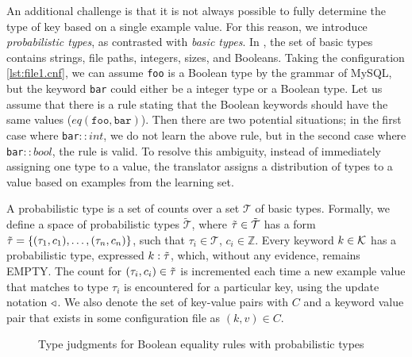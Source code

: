An additional challenge is that it is not always possible to fully determine the type of key based on a single example value. 
For this reason, we introduce \textit{probabilistic types}, as contrasted with \textit{basic types}.
In \app, the set of basic types contains strings, file paths, integers, sizes, and Booleans. 
Taking the configuration \ref{lst:file1.cnf}, we can assume {\tt foo} is a Boolean type by the grammar of MySQL,
  but the keyword {\tt bar} could either be a integer type or a Boolean type.
Let us assume that there is a rule stating that the Boolean keywords should have the same values ($eq(\texttt{foo},\texttt{bar})$).
Then there are two potential situations; in the first case where {\tt bar}$::int$, we do not learn the above rule, but in the second case where {\tt bar}$::bool$, the rule is valid.
To resolve this ambiguity, instead of immediately assigning one type to a value, the translator assigns a distribution of types to a value based on examples from the learning set.


A probabilistic type is a set of counts over a set $\mathcal{T}$ of basic types.
Formally, we define a space of probabilistic types $\tilde{\mathcal{T}}$, where $\tilde{\tau} \in \tilde{\mathcal{T}}$ has a form $\tilde{\tau}=\{(\tau_1, c_1),\ldots,(\tau_n, c_n)\}$, such that $\tau_i \in \mathcal{T}$, $c_i \in \mathbb{Z}$. 
Every keyword $k\in\mathcal{K}$ has a probabilistic type, expressed $k:\tilde{\tau}$, which, without any evidence, remains {\scriptsize EMPTY}.
The count for $(\tau_i,c_i) \in \tilde{\tau}$ is incremented each time a new example value that matches to type $\tau_i$ is encountered for a particular key, using the update notation $\triangleleft$.
We also denote the set of key-value pairs with $C$ and a keyword value pair that exists in some configuration file as $(k,v) \in C$.

{
\setlength{\abovecaptionskip}{-.05pt}
\setlength{\belowcaptionskip}{-15pt}
\begin{figure}
\caption{Type judgments for Boolean equality rules with probabilistic types}
\label{fig:ptypes}
\end{figure}
}

